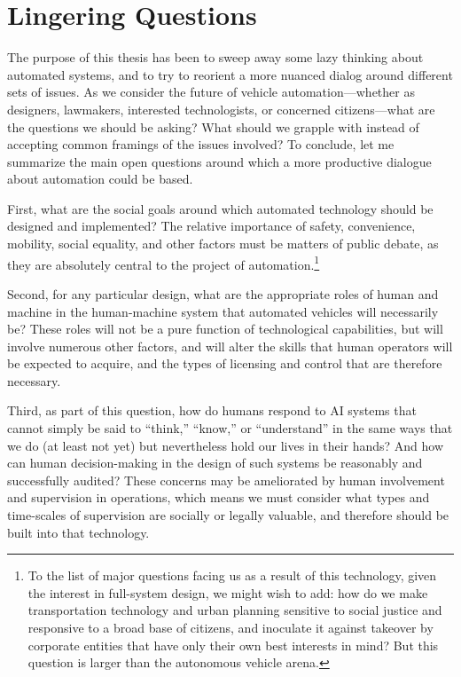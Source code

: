 
\section{Lingering Questions}

The purpose of this thesis has been to sweep away some lazy thinking
about automated systems, and to try to reorient a more nuanced dialog
around different sets of issues. As we consider the future of
vehicle automation---whether as
designers, lawmakers, interested technologists, or concerned
citizens---what are the questions we should be asking? What should we
grapple with instead of accepting common framings of the issues
involved? To conclude, let me summarize the main open questions around
which a more productive dialogue about automation could be based.

First, what are the social goals around which automated technology
should be designed and implemented? The relative importance of safety,
convenience, mobility, social equality, and other factors must be
matters of public debate, as they are absolutely central to the
project of automation.\footnote{To the list
of major questions facing us as a result of this technology, given the
interest in full-system design, we might
wish to
add: how do we make transportation technology and urban planning sensitive to social
justice and responsive to a broad base of citizens, and inoculate it
against takeover by corporate entities that have only their own best interests
in mind? But this question is larger than the autonomous vehicle arena.}

Second, for any particular design, what are the appropriate roles of
human and machine in the human-machine system that automated vehicles
will necessarily be? These roles will not be a pure function of
technological capabilities, but will involve numerous other factors,
and will alter the skills that human operators will be expected to
acquire, and the types of licensing and control that are therefore
necessary. 

Third, as part of this question, how do humans
respond to AI systems that cannot simply be said to
``think,'' ``know,'' or ``understand'' in the same ways that we do (at
least not yet) but nevertheless hold our lives in their hands?
And how can human decision-making in the design of such systems be
reasonably and successfully audited?
These concerns may be ameliorated by human involvement and
supervision in operations, which means we must consider what types and
time-scales of supervision are socially or legally valuable, and
therefore should be built into that technology. 

